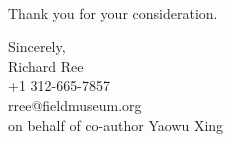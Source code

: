 \documentclass[11pt]{letter}
\begin{document}
\begin{letter}{ \\

}

Thank you for your consideration.


\closing{Sincerely,\\
  \bigskip
  Richard Ree\\
  +1 312-665-7857\\
  rree@fieldmuseum.org\\
  \medskip on behalf of co-author Yaowu Xing
  }


\end{letter}
\end{document}
